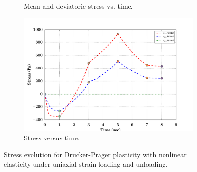 \begin{figure}[htbp!]
\begin{subfigure}{0.5\textwidth}
    \caption{Mean and deviatoric stress vs. time.}
  \end{subfigure}
  \begin{subfigure}{0.5\textwidth}
    \centering
    \includegraphics[width=\textwidth]{MPMMaterials/FIGS/UniaxialStrainLoadUnloadNonLinDPNonLin_sigma_time.pdf}
    \caption{Stress versus time.}
  \end{subfigure}
  \caption{Stress evolution for Drucker-Prager plasticity with nonlinear elasticity under uniaxial strain
           loading and unloading.}
  \label{fig:NonLinDPNonLinLoadUnload}
\end{figure}

